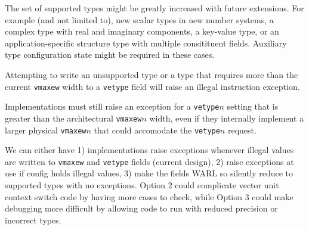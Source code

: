\begin{commentary}
  The set of supported types might be greatly increased with future
  extensions.  For example (and not limited to), new scalar types in
  new number systems, a complex type with real and imaginary
  components, a key-value type, or an application-specific structure
  type with multiple consitituent fields.  Auxiliary type
  configuration state might be required in these cases.
\end{commentary}

Attempting to write an unsupported type or a type that requires more
than the current {\tt vmaxew} width to a {\tt vetype} field will raise
an illegal instruction exception.

\begin{commentary}
Implementations must still raise an exception for a {\tt vetype}$n$
setting that is greater than the architectural {\tt vmaxew}$n$ width,
even if they internally implement a larger physical {\tt vmaxew}$n$
that could accomodate the {\tt vetype}$n$ request.
\end{commentary}

\begin{discussion}
We can either have 1) implementations raise exceptions whenever
illegal values are written to {\tt vmaxew} and {\tt vetype} fields
(current design), 2) raise exceptions at use if config holds illegal
values, 3) make the fields WARL so silently reduce to supported types
with no exceptions.  Option 2 could complicate vector unit context
switch code by having more cases to check, while Option 3 could make
debugging more difficult by allowing code to run with reduced
precision or incorrect types.
\end{discussion}

